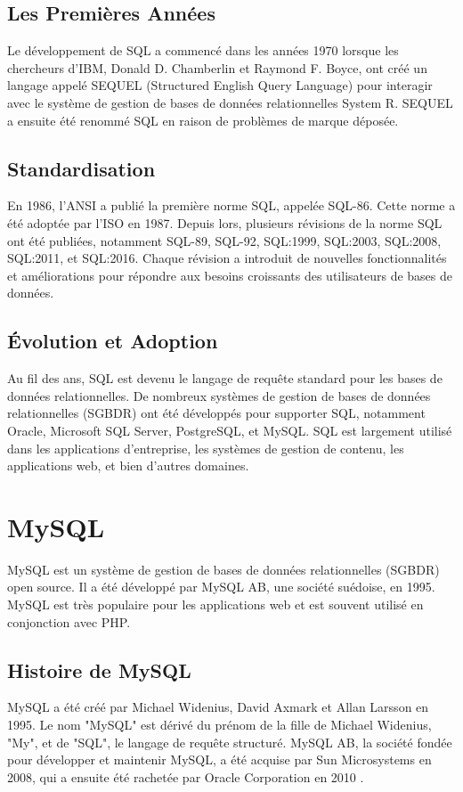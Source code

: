 \documentclass{article}
\begin{document}
\subsection{Les Premières Années}
Le développement de SQL a commencé dans les années 1970 lorsque les chercheurs d'IBM, Donald D. Chamberlin et Raymond F. Boyce, ont créé un langage appelé SEQUEL (Structured English Query Language) pour interagir avec le système de gestion de bases de données relationnelles System R. SEQUEL a ensuite été renommé SQL en raison de problèmes de marque déposée.

\subsection{Standardisation}
En 1986, l'ANSI a publié la première norme SQL, appelée SQL-86. Cette norme a été adoptée par l'ISO en 1987. Depuis lors, plusieurs révisions de la norme SQL ont été publiées, notamment SQL-89, SQL-92, SQL:1999, SQL:2003, SQL:2008, SQL:2011, et SQL:2016. Chaque révision a introduit de nouvelles fonctionnalités et améliorations pour répondre aux besoins croissants des utilisateurs de bases de données.

\subsection{Évolution et Adoption}
Au fil des ans, SQL est devenu le langage de requête standard pour les bases de données relationnelles. De nombreux systèmes de gestion de bases de données relationnelles (SGBDR) ont été développés pour supporter SQL, notamment Oracle, Microsoft SQL Server, PostgreSQL, et MySQL. SQL est largement utilisé dans les applications d'entreprise, les systèmes de gestion de contenu, les applications web, et bien d'autres domaines.

\section{MySQL}
MySQL est un système de gestion de bases de données relationnelles (SGBDR) open source. Il a été développé par MySQL AB, une société suédoise, en 1995. MySQL est très populaire pour les applications web et est souvent utilisé en conjonction avec PHP.

\subsection{Histoire de MySQL}
MySQL a été créé par Michael Widenius, David Axmark et Allan Larsson en 1995. Le nom "MySQL" est dérivé du prénom de la fille de Michael Widenius, "My", et de "SQL", le langage de requête structuré. MySQL AB, la société fondée pour développer et maintenir MySQL, a été acquise par Sun Microsystems en 2008, qui a ensuite été rachetée par Oracle Corporation en 2010 \cite{mysql}.
\end{document}
